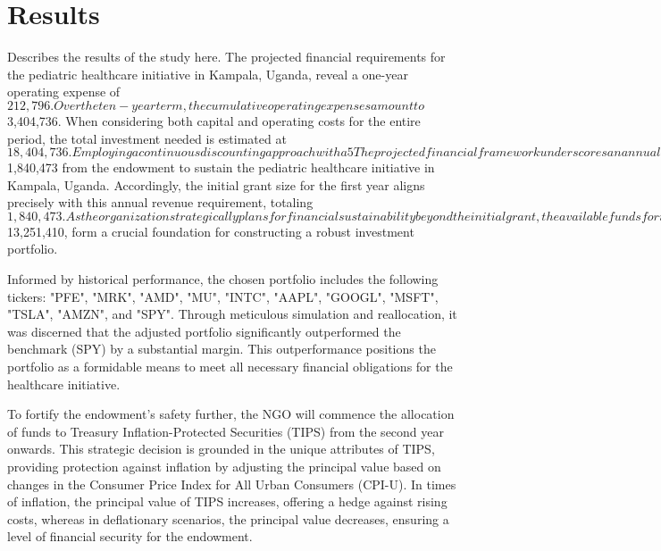 \documentclass[10pt,twocolumn,twoside,final]{IEEEtran}
\begin{document}
{{\section{Results}
Describes the results of the study here.
The projected financial requirements for the pediatric healthcare initiative in Kampala, Uganda, reveal a one-year operating expense of $212,796. Over the ten-year term, the cumulative operating expenses amount to $3,404,736. When considering both capital and operating costs for the entire period, the total investment needed is estimated at $18,404,736. Employing a continuous discounting approach with a 5%
The projected financial framework underscores an annual revenue requirement of $1,840,473 from the endowment to sustain the pediatric healthcare initiative in Kampala, Uganda. Accordingly, the initial grant size for the first year aligns precisely with this annual revenue requirement, totaling $1,840,473. As the organization strategically plans for financial sustainability beyond the initial grant, the available funds for investment, calculated at $13,251,410, form a crucial foundation for constructing a robust investment portfolio.

Informed by historical performance, the chosen portfolio includes the following tickers: "PFE", "MRK", "AMD", "MU", "INTC", "AAPL", "GOOGL", "MSFT", "TSLA", "AMZN", and "SPY". Through meticulous simulation and reallocation, it was discerned that the adjusted portfolio significantly outperformed the benchmark (SPY) by a substantial margin. This outperformance positions the portfolio as a formidable means to meet all necessary financial obligations for the healthcare initiative.

To fortify the endowment's safety further, the NGO will commence the allocation of funds to Treasury Inflation-Protected Securities (TIPS) from the second year onwards. This strategic decision is grounded in the unique attributes of TIPS, providing protection against inflation by adjusting the principal value based on changes in the Consumer Price Index for All Urban Consumers (CPI-U). In times of inflation, the principal value of TIPS increases, offering a hedge against rising costs, whereas in deflationary scenarios, the principal value decreases, ensuring a level of financial security for the endowment.

}}
\end{document}
